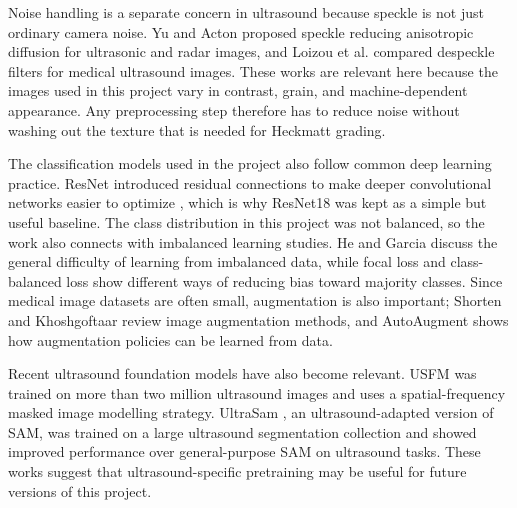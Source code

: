 Noise handling is a separate concern in ultrasound because speckle is not just ordinary camera noise. Yu and Acton \cite{YuActon2002} proposed speckle reducing anisotropic diffusion for ultrasonic and radar images, and Loizou et al. \cite{Loizou2005} compared despeckle filters for medical ultrasound images. These works are relevant here because the images used in this project vary in contrast, grain, and machine-dependent appearance. Any preprocessing step therefore has to reduce noise without washing out the texture that is needed for Heckmatt grading.

The classification models used in the project also follow common deep learning practice. ResNet introduced residual connections to make deeper convolutional networks easier to optimize \cite{he2016resnet}, which is why ResNet18 was kept as a simple but useful baseline. The class distribution in this project was not balanced, so the work also connects with imbalanced learning studies. He and Garcia \cite{HeGarcia2009} discuss the general difficulty of learning from imbalanced data, while focal loss \cite{LinFocal2017} and class-balanced loss \cite{Cui2019} show different ways of reducing bias toward majority classes. Since medical image datasets are often small, augmentation is also important; Shorten and Khoshgoftaar \cite{Shorten2019} review image augmentation methods, and AutoAugment \cite{Cubuk2019} shows how augmentation policies can be learned from data.

Recent ultrasound foundation models have also become relevant. USFM \cite{JIAO2024103202} was trained on more than two million ultrasound images and uses a spatial-frequency masked image modelling strategy. UltraSam \cite{meyer2024ultrasam}, an ultrasound-adapted version of SAM, was trained on a large ultrasound segmentation collection and showed improved performance over general-purpose SAM on ultrasound tasks. These works suggest that ultrasound-specific pretraining may be useful for future versions of this project.

